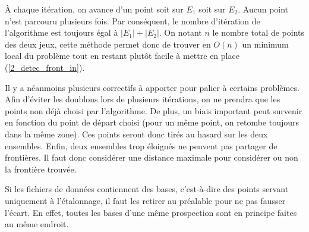 \documentclass[12pt]{article}
\begin{document}
    À chaque itération, on avance d'un point soit sur $E_1$ soit sur $E_2$. Aucun point n'est parcouru plusieurs fois. Par conséquent, le nombre d'itération de l'algorithme est toujours égal à $|E_1| + |E_2|$. On notant $n$ le nombre total de points des deux jeux, cette méthode permet donc de trouver en $O(n)$ un minimum local du problème tout en restant plutôt facile à mettre en place \label{2_detec_front_out} (\ref{2_detec_front_in}).

    
    
    Il y a néanmoins plusieurs correctifs à apporter pour palier à certains problèmes. Afin 
    d'éviter les doublons lors de plusieurs itérations, on ne prendra que les points non déjà choisi par l'algorithme. De plus, un biais important peut survenir en fonction du point de départ choisi (pour un même point, on retombe toujours dans la même zone). Ces points seront donc tirés au hasard sur les deux ensembles. Enfin, deux ensembles trop éloignés ne peuvent pas partager de frontières. Il faut donc considérer une distance maximale pour considérer ou non la frontière trouvée.

    Si les fichiers de données contiennent des bases, c'est-à-dire des points servant uniquement à l'étalonnage, il faut les retirer au préalable pour ne pas fausser l'écart. En effet, toutes les bases d'une même prospection sont en principe faites au même endroit.
    
\end{document}
